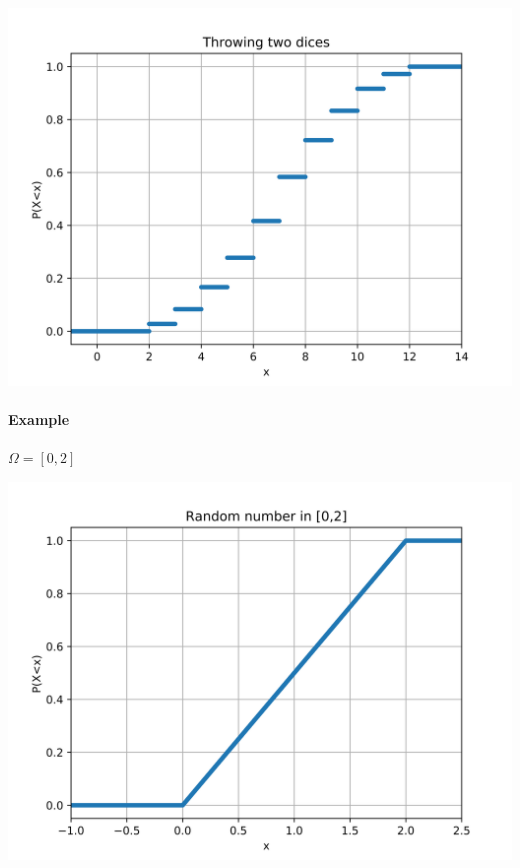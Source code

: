 \begin{center}
	\includegraphics[width=0.5\linewidth]{./lect4/1.png}
\end{center}

\paragraph{Example} $\Omega = [0,2]$


\begin{center}
	\includegraphics[width=0.5\linewidth]{./lect4/2.png}
\end{center}
